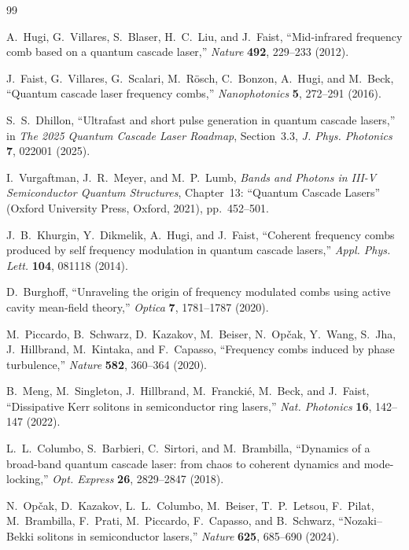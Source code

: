 \documentclass[11pt,letterpaper]{article}
\begin{document}
\begin{thebibliography}{99}

A.~Hugi, G.~Villares, S.~Blaser, H.~C.~Liu, and J.~Faist, ``Mid-infrared frequency comb based on a quantum cascade laser,'' \textit{Nature} \textbf{492}, 229--233 (2012).

J.~Faist, G.~Villares, G.~Scalari, M.~R\"osch, C.~Bonzon, A.~Hugi, and M.~Beck, ``Quantum cascade laser frequency combs,'' \textit{Nanophotonics} \textbf{5}, 272--291 (2016).

S.~S.~Dhillon, ``Ultrafast and short pulse generation in quantum cascade lasers,'' in \textit{The 2025 Quantum Cascade Laser Roadmap}, Section~3.3, \textit{J. Phys. Photonics} \textbf{7}, 022001 (2025).

I.~Vurgaftman, J.~R.~Meyer, and M.~P.~Lumb, \textit{Bands and Photons in III-V Semiconductor Quantum Structures}, Chapter~13: ``Quantum Cascade Lasers'' (Oxford University Press, Oxford, 2021), pp.~452--501.

J.~B.~Khurgin, Y.~Dikmelik, A.~Hugi, and J.~Faist, ``Coherent frequency combs produced by self frequency modulation in quantum cascade lasers,'' \textit{Appl. Phys. Lett.} \textbf{104}, 081118 (2014).

D.~Burghoff, ``Unraveling the origin of frequency modulated combs using active cavity mean-field theory,'' \textit{Optica} \textbf{7}, 1781--1787 (2020).

M.~Piccardo, B.~Schwarz, D.~Kazakov, M.~Beiser, N.~Op\v{c}ak, Y.~Wang, S.~Jha, J.~Hillbrand, M.~Kintaka, and F.~Capasso, ``Frequency combs induced by phase turbulence,'' \textit{Nature} \textbf{582}, 360--364 (2020).

B.~Meng, M.~Singleton, J.~Hillbrand, M.~Francki\'e, M.~Beck, and J.~Faist, ``Dissipative Kerr solitons in semiconductor ring lasers,'' \textit{Nat. Photonics} \textbf{16}, 142--147 (2022).

L.~L.~Columbo, S.~Barbieri, C.~Sirtori, and M.~Brambilla, ``Dynamics of a broad-band quantum cascade laser: from chaos to coherent dynamics and mode-locking,'' \textit{Opt. Express} \textbf{26}, 2829--2847 (2018).

N.~Op\v{c}ak, D.~Kazakov, L.~L.~Columbo, M.~Beiser, T.~P.~Letsou, F.~Pilat, M.~Brambilla, F.~Prati, M.~Piccardo, F.~Capasso, and B.~Schwarz, ``Nozaki--Bekki solitons in semiconductor lasers,'' \textit{Nature} \textbf{625}, 685--690 (2024).


\end{thebibliography}
\end{document}
